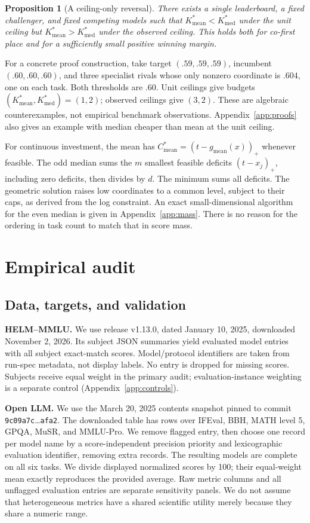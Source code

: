 \documentclass{article}
\newtheorem{proposition}{Proposition}
\newcommand{\K}{K^*}
\newcommand{\mean}{\mathrm{mean}}
\newcommand{\med}{\mathrm{med}}
\begin{document}
\begin{proposition}[A ceiling-only reversal]
\label{prop:flip}
There exists a single leaderboard, a fixed challenger, and fixed competing models
such that $\K_\mean<\K_\med$ under the unit ceiling but
$\K_\mean>\K_\med$ under the observed ceiling. This holds both for co-first place
and for a sufficiently small positive winning margin.
\end{proposition}
For a concrete proof construction, take target $(.59,.59,.59)$, incumbent
$(.60,.60,.60)$, and three specialist rivals whose only nonzero coordinate is
$.604$, one on each task. Both thresholds are $.60$. Unit ceilings give budgets
$(K^*_\mean,K^*_\med)=(1,2)$; observed ceilings give $(3,2)$. These are algebraic
counterexamples, not empirical benchmark observations. Appendix~\ref{app:proofs}
also gives an example with median cheaper than mean at the unit ceiling.

For continuous investment, the mean has $C^*_\mean=(t-g_\mean(x))_+$ whenever
feasible. The odd median sums the $m$ smallest feasible deficits $(t-x_j)_+$,
including zero deficits, then divides by $d$. The minimum sums all deficits.
The geometric solution raises low coordinates to a common level, subject to
their caps, as derived from the log constraint. An exact small-dimensional
algorithm for the even median is given in Appendix~\ref{app:mass}.
There is no reason for the ordering in task count to match that in score mass.

\section{Empirical audit}
\label{sec:experiments}
\subsection{Data, targets, and validation}
\label{sec:data}
\textbf{HELM--MMLU.} We use release v1.13.0, dated January 10, 2025, downloaded
November 2, 2026. Its subject JSON summaries yield \HelmN{} evaluated model entries
with all \HelmD{} subject exact-match scores. Model/protocol identifiers are taken
from run-spec metadata, not display labels. No entry is dropped for missing scores.
Subjects receive equal weight in the primary audit; evaluation-instance weighting
is a separate control (Appendix~\ref{app:controls}).

\textbf{Open LLM.} We use the March 20, 2025 contents snapshot pinned to commit
\texttt{9c09a7c}\ldots\texttt{afa2}. The downloaded table has \OllRawN{} rows over
IFEval, BBH, MATH level 5, GPQA, MuSR, and MMLU-Pro. We remove \OllFlagged{} flagged
entry, then choose one record per model name by a score-independent precision
priority and lexicographic evaluation identifier, removing \OllDuplicates{} extra
records. The resulting \OllN{} models are complete on all six tasks. We divide
displayed normalized scores by 100; their equal-weight mean exactly reproduces
the provided average. Raw metric columns and all unflagged evaluation entries are
separate sensitivity panels. We do not assume that heterogeneous metrics have a
shared scientific utility merely because they share a numeric range.
\end{document}
